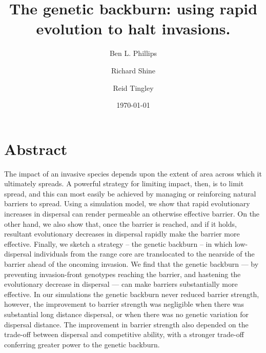 \documentclass{article}
\begin{document}
\title{The genetic backburn: using rapid evolution to halt invasions.}

\author{Ben L. Phillips}

  
\author{Richard Shine}
  
\author{Reid Tingley}
  


\date{\today}



\maketitle 


\newpage
\linenumbers

\section{Abstract}
The impact of an invasive species depends upon the extent of area across which it ultimately spreads.  A powerful strategy for limiting impact, then, is to limit spread, and this can most easily be achieved by managing or reinforcing natural barriers to spread.  Using a simulation model, we show that rapid evolutionary increases in dispersal can render permeable an otherwise effective barrier.  On the other hand, we also show that, once the barrier is reached, and if it holds, resultant evolutionary decreases in dispersal rapidly make the barrier more effective.  Finally, we sketch a strategy -- the genetic backburn -- in which low-dispersal individuals from the range core are translocated to the nearside of the barrier ahead of the oncoming invasion.  We find that the genetic backburn --- by preventing invasion-front genotypes reaching the barrier, and hastening the evolutionary decrease in dispersal --- can make barriers substantially more effective.  In our simulations the genetic backburn never reduced barrier strength, however, the improvement to barrier strength was negligible when there was substantial long distance dispersal, or when there was no genetic variation for dispersal distance.  The improvement in barrier strength also depended on the trade-off between dispersal and competitive ability, with a stronger trade-off conferring greater power to the genetic backburn.

\bigskip
\end{document}
